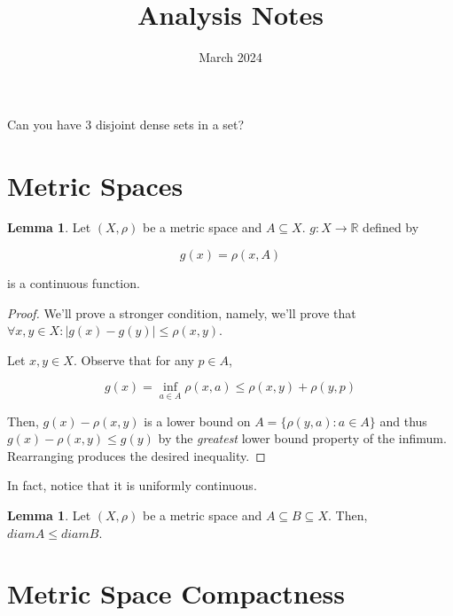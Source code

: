 \documentclass{article}
\title{Analysis Notes}
\date{March 2024}
\theoremstyle{definition}
\newtheorem{lemma}[theorem]{Lemma}
\newcommand{\R}{\mathbb{R}}
\begin{document}
\maketitle

Can you have 3 disjoint dense sets in a set?

\section{Metric Spaces}

\begin{lemma}
    Let $(X,\rho)$ be a metric space and $A \subseteq X$. $g: X \xrightarrow{} \R$ defined by
    
    \[ g(x) = \rho(x,A)\]

    is a continuous function.
\end{lemma}
\begin{proof}
    We'll prove a stronger condition, namely, we'll prove that $\forall x,y \in X: \lvert g(x) - g(y) \rvert \leq \rho(x,y)$.

    Let $x,y \in X$. Observe that for any $p \in A$,
    
    \[g(x) = \inf_{a \in A} \rho(x,a) \leq \rho(x,y) + \rho(y,p) \]

    Then, $g(x) - \rho(x,y)$ is a lower bound on $A = \{\rho(y,a): a \in A\}$ and thus
    $g(x) - \rho(x,y) \leq g(y)$ by the \textit{greatest} lower bound property of the
    infimum. Rearranging produces the desired inequality.
\end{proof}

In fact, notice that it is uniformly continuous.

\begin{lemma}
    Let $(X,\rho)$ be a metric space and $A \subseteq B \subseteq X$.
    Then, $diamA \leq diamB$.
\end{lemma}

\newpage

\section{Metric Space Compactness}
\end{document}
